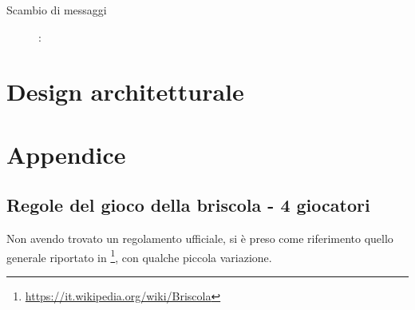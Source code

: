 \documentclass[a4paper,12pt]{article}
\begin{document}
\begin{description}
	\item[Scambio di messaggi]:
\end{description}

\section{Design architetturale} \label{design}

\fancyhead{}
\renewcommand{\headrulewidth}{0pt}
\appendix
{}
\section*{Appendice}

\subsection*{Regole del gioco della briscola - 4 giocatori}\label{briscola-rules}

Non avendo trovato un regolamento ufficiale, si è preso come riferimento quello generale riportato in \footnote{\url{https://it.wikipedia.org/wiki/Briscola}}, con qualche piccola variazione.
 
\end{document}
